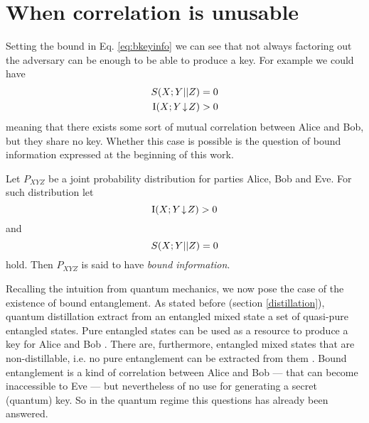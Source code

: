 \section{When correlation is unusable}
Setting the bound in Eq. \ref{eq:bkeyinfo} we can see that not always factoring out the adversary can be enough to be able to produce a key.
For example we could have 
\begin{align*}
	S(X;Y||Z) & = 0 \\
	\operatorname{I}(X;Y\!\downarrow\!Z) & > 0 
\end{align*}
meaning that there exists some sort of mutual correlation between Alice and Bob, but they share no key.
Whether this case is possible is the question of bound information expressed at the beginning of this work.
\begin{definition}\cite{GisWolf00, RW03} 
Let $P_{XYZ}$ be a joint probability distribution for parties Alice, Bob and Eve.
For such distribution let 
\begin{equation}
	\operatorname{I}(X;Y\!\downarrow\!Z) > 0
\end{equation}
and 
\begin{equation}
S(X;Y||Z) = 0
\end{equation}
hold.
Then $P_{XYZ}$ is said to have \emph{bound information}.
\end{definition}

Recalling the intuition from quantum mechanics, we now pose the case of the existence of bound entanglement.
As stated before (section \ref{distillation}), quantum distillation extract from an entangled mixed state a set of quasi-pure entangled states.
Pure entangled states can be used as a resource to produce a key for Alice and Bob \cite{Ekert91}.
There are, furthermore, entangled mixed states that are non-distillable, i.e. no pure entanglement can be extracted from them \cite{3H98}.
Bound entanglement is a kind of correlation between Alice and Bob --- that can become inaccessible to Eve --- but nevertheless of no use for generating a secret (quantum) key.
So in the quantum regime this questions has already been answered.
	
	
	
		
